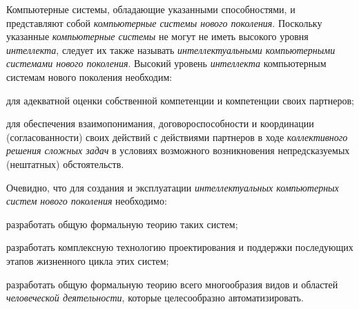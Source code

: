 Компьютерные системы, обладающие указанными способностями, и представляют собой \textit{компьютерные системы нового поколения}. Поскольку указанные \textit{компьютерные системы} не могут не иметь высокого уровня \textit{интеллекта}, следует их также называть \textit{интеллектуальными компьютерными системами нового поколения}. Высокий уровень \textit{интеллекта} компьютерным системам нового поколения необходим:
\begin{textitemize}
	\item для адекватной оценки собственной компетенции и компетенции своих партнеров;
	\item для обеспечения взаимопонимания, договороспособности и координации (согласованности) своих действий с действиями партнеров в ходе \textit{коллективного решения сложных задач} в условиях возможного возникновения непредсказуемых (нештатных) обстоятельств.
\end{textitemize}

Очевидно, что для создания и эксплуатации \textit{интеллектуальных компьютерных систем нового поколения} необходимо:
\begin{textitemize}
	\item разработать общую формальную теорию таких систем;
	\item разработать комплексную технологию проектирования и поддержки последующих этапов жизненного цикла этих систем;
	\item разработать общую формальную теорию всего многообразия видов и областей \textit{человеческой деятельности}, которые целесообразно автоматизировать.
\end{textitemize}

\begin{SCn}

\end{SCn}

